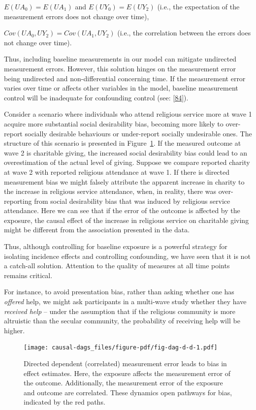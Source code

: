 \documentclass[
  singlecolumn]{article}
\begin{document}
\(E(UA_0) = E(UA_1)\) and \(E(UY_0) = E(UY_2)\) (i.e., the expectation
of the measurement errors does not change over time),

\(Cov(UA_0, UY_2) = Cov(UA_1, UY_2)\) (i.e., the correlation between the
errors does not change over time).

Thus, including baseline measurements in our model can mitigate
undirected measurement errors. However, this solution hinges on the
measurement error being undirected and non-differential concerning time.
If the measurement error varies over time or affects other variables in
the model, baseline measurement control will be inadequate for
confounding control (see: {[}\protect\hyperlink{ref-keogh2020}{84}{]}).

Consider a scenario where individuals who attend religious service more
at wave 1 acquire more substantial social desirability bias, becoming
more likely to over-report socially desirable behaviours or under-report
socially undesirable ones. The structure of this scenario is presented
in Figure~\ref{fig-dag-d-d}. If the measured outcome at wave 2 is
charitable giving, the increased social desirability bias could lead to
an overestimation of the actual level of giving. Suppose we compare
reported charity at wave 2 with reported religious attendance at wave 1.
If there is directed measurement bias we might falsely attribute the
apparent increase in charity to the increase in religious service
attendance, when, in reality, there was over-reporting from social
desirability bias that was induced by religious service attendance. Here
we can see that if the error of the outcome is affected by the exposure,
the causal effect of the increase in religious service on charitable
giving might be different from the association presented in the data.

Thus, although controlling for baseline exposure is a powerful strategy
for isolating incidence effects and controlling confounding, we have
seen that it is not a catch-all solution. Attention to the quality of
measures at all time points remains critical.

For instance, to avoid presentation bias, rather than asking whether one
has \emph{offered} help, we might ask participants in a multi-wave study
whether they have \emph{received help} -- under the assumption that if
the religious community is more altruistic than the secular community,
the probability of receiving help will be higher.

\begin{figure}

{\centering \texttt{[image: causal-dags\_files/figure-pdf/fig-dag-d-d-1.pdf]}

}

\caption{\label{fig-dag-d-d}Directed dependent (correlated) measurement
error leads to bias in effect estimates. Here, the exposure affects the
measurement error of the outcome. Additionally, the measurement error of
the exposure and outcome are correlated. These dynamics open pathways
for bias, indicated by the red paths.}

\end{figure}
\end{document}
